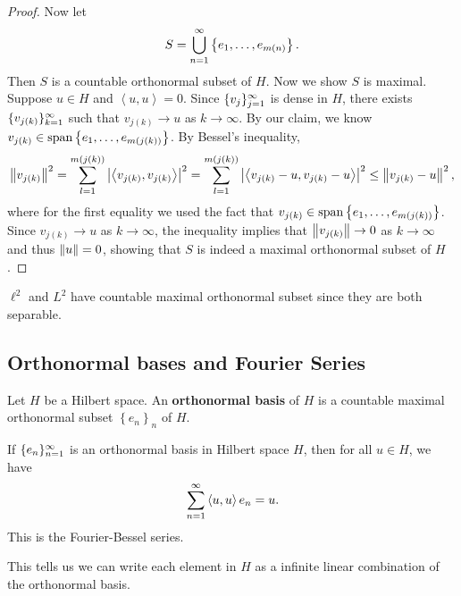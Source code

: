 \documentclass[a4paper]{article}
\renewcommand{\braket}[2]{\left\langle #1, #1 \right\rangle}
\begin{document}
\begin{proof}
  Now let
  \[
    S = \bigcup_{n=1}^\infty \left\{ e_1, \dots, e_{m(n)} \right\}.
  \]
  Then $S$ is a countable orthonormal subset of $H$.
  Now we show $S$ is maximal. Suppose $u \in H$ and
  $\braket{u}{e_l} = 0$. Since $\{ v_j \}_{j=1}^\infty$ is dense in
  $H$, there exists $\{ v_{j(k)} \}_{k=1}^\infty$ such that
  $v_{j(k)} \to u$ as $k \to \infty$.
  By our claim, we know
  $v_{j(k)} \in \operatorname{span} \left\{ e_1, \dots, e_{m(j(k))} \right\}$.
  By Bessel's inequality,
  \[
    \begin{aligned}
      \norm{v_{j(k)}}^2
      = \sum_{l=1}^{m(j(k))} \abs{\braket{v_{j(k)}}{e_l}}^2
      = \sum_{l=1}^{m(j(k))} \abs{\braket{v_{j(k)} - u}{e_l}}^2
      \leq \norm{v_{j(k)} - u}^2,
    \end{aligned}
  \]
  where for the first equality we used the fact that
  $v_{j(k)} \in \operatorname{span} \left\{ e_1, \dots, e_{m(j(k))} \right\}$.
  Since $v_{j(k)} \to u$ as $k \to \infty$,
  the inequality implies that
  $\left\lVert v_{j(k)}\right\rVert \to 0$ as $k \to \infty$
  and thus $\left\lVert u\right\rVert = 0$, showing that
  $S$ is indeed a maximal orthonormal subset
  of $H$.
\end{proof}

\begin{cor}
  $\ell^2$ and $L^2$ have countable maximal orthonormal
  subset since they are both separable.
\end{cor}

\subsection{Orthonormal bases and Fourier Series}

\begin{defi}
  Let $H$ be a Hilbert space. An \textbf{orthonormal basis}
  of $H$ is a countable maximal orthonormal subset
  $\left\{ e_n \right\}_n$ of $H$.
\end{defi}

\begin{thm}
  If $\{ e_n \}_{n=1}^\infty$ is an orthonormal basis in
  Hilbert space $H$, then for all $u \in H$, we have
  \[
    \suminfn \braket{u}{e_n} e_n = u.
  \]
  This is the Fourier-Bessel series.

  This tells us we can write each element in $H$ as a
  infinite linear combination of the orthonormal basis.
\end{thm}
\end{document}
